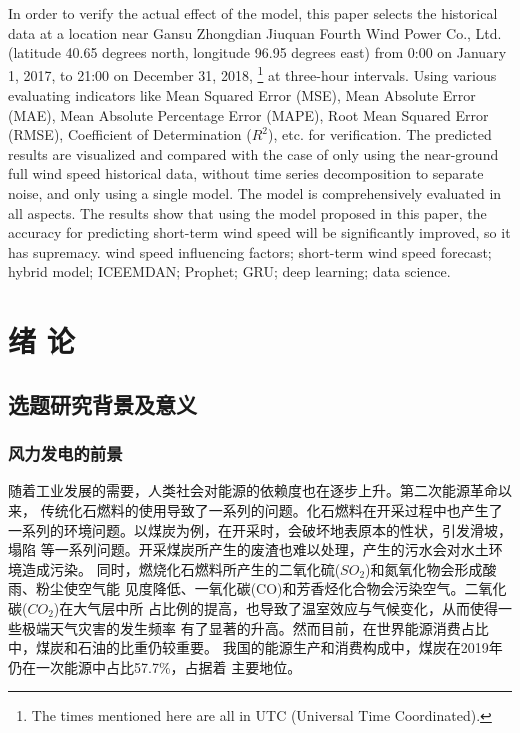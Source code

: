 \documentclass[AutoFakeBold]{LZUThesis}
\begin{document}
{{In order to verify the actual effect of the model, this paper selects the
historical data at a location near Gansu Zhongdian Jiuquan Fourth Wind Power
Co., Ltd. (latitude 40.65 degrees north, longitude 96.95 degrees east) from
0:00 on January 1, 2017, to 21:00 on December 31, 2018, 
\footnote{The times mentioned here are all in UTC (Universal Time Coordinated). }
at three-hour intervals. Using various evaluating indicators like Mean Squared
Error (MSE), Mean Absolute Error (MAE), Mean Absolute Percentage Error (MAPE),
Root Mean Squared Error (RMSE), Coefficient of Determination ($R^2$), etc.
for verification. The predicted results are visualized and compared with the
case of only using the near-ground full wind speed historical data, without
time series decomposition to separate noise, and only using a single model.
The model is comprehensively evaluated in all aspects. The results show
that using the model proposed in this paper, the accuracy for predicting
short-term wind speed will be significantly improved, so it has supremacy.
}}
{wind speed influencing factors; short-term wind speed forecast; 
hybrid model; ICEEMDAN; Prophet; GRU; deep learning; data science.
}

\tableofcontents


\mainmatter

\chapter{绪 \qquad 论}


\section{选题研究背景及意义}
\subsection{风力发电的前景}
随着工业发展的需要，人类社会对能源的依赖度也在逐步上升。第二次能源革命以来，
传统化石燃料的使用导致了一系列的问题。化石燃料在开采过程中也产生了
一系列的环境问题。以煤炭为例，在开采时，会破坏地表原本的性状，引发滑坡，塌陷
等一系列问题。开采煤炭所产生的废渣也难以处理，产生的污水会对水土环境造成污染。
同时，燃烧化石燃料所产生的二氧化硫($SO_2$)和氮氧化物会形成酸雨、粉尘使空气能
见度降低、一氧化碳(CO)和芳香烃化合物会污染空气。二氧化碳($CO_2$)在大气层中所
占比例的提高，也导致了温室效应与气候变化，从而使得一些极端天气灾害的发生频率
有了显著的升高。然而目前，在世界能源消费占比中，煤炭和石油的比重仍较重要。
我国的能源生产和消费构成中，煤炭在2019年仍在一次能源中占比57.7\%，占据着
主要地位。\cite{能源数据2021王庆一}
\end{document}
